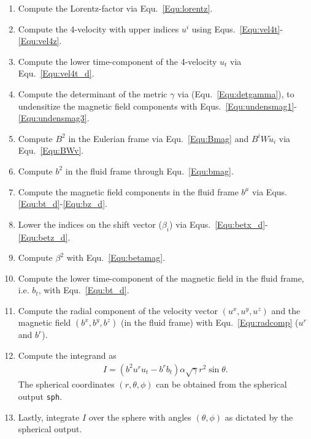 \documentclass{article}
\newcommand{\var}[1]{%
  {\setlength{\fboxsep}{1.5pt}%
   \colorbox{varbg}{\textcolor{varfg}{\texttt{\small #1}}}}}
\begin{document}
\begin{enumerate}
  \item Compute the Lorentz-factor via Equ.~\eqref{Equ:lorentz}.
  \item Compute the 4-velocity with upper indices $u^i$ using Equs.~\eqref{Equ:vel4t}-\eqref{Equ:vel4z}.
  \item Compute the lower time-component of the 4-velocity $u_t$ via Equ.~\eqref{Equ:vel4t_d}.
  \item Compute the determinant of the metric $\gamma$ via (Equ.~\eqref{Equ:detgamma}), to undensitize
  the magnetic field components with Equs.~\eqref{Equ:undensmag1}-\eqref{Equ:undensmag3}.
  \item Compute $B^2$ in the Eulerian frame via Equ.~\eqref{Equ:Bmag} and $B^iW\tilde{u}_i$ via Equ.~\eqref{Equ:BWv}.
  \item Compute $b^2$ in the fluid frame through Equ.~\eqref{Equ:bmag}.
  \item Compute the magnetic field components in the fluid frame $b^{\mu}$ via Equs.\eqref{Equ:bt_d}-\eqref{Equ:bz_d}.
  \item Lower the indices on the shift vector ($\beta_i$) via Equs.~\eqref{Equ:betx_d}-\eqref{Equ:betz_d}.
  \item Compute $\beta^2$ with Equ.~\eqref{Equ:betamag}.
  \item Compute the lower time-component of the magnetic field in the fluid frame, i.e. $b_t$, with Equ.~\eqref{Equ:bt_d}.
  \item Compute the radial component of the velocity vector $(u^x,u^y,u^z)$ and the magnetic field $(b^x,b^y,b^z)$ (in the fluid frame)
  with Equ.~\eqref{Equ:radcomp} ($u^r$ and $b^r$).
  \item Compute the integrand as
  \begin{align}
    I = (b^2u^ru_t-b^rb_t)\alpha\sqrt{\gamma}r^2\sin{\theta}.\nonumber
  \end{align}
  The spherical coordinates $(r,\theta,\phi)$ can be obtained from the spherical output \var{sph}.
  \item Lastly, integrate $I$ over the sphere with angles $(\theta,\phi)$ as dictated by the spherical output.
\end{enumerate}
\end{document}
